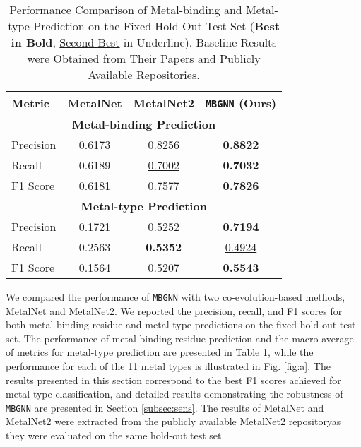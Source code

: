 \documentclass[letterpaper, 10 pt, conference]{ieeeconf}
\begin{document}
\begin{table}[t]
\centering
\caption{Performance Comparison of Metal-binding and Metal-type Prediction on the Fixed Hold-Out Test Set (\textbf{Best in Bold}, \underline{Second Best} in Underline). Baseline Results were Obtained from Their Papers and Publicly Available Repositories.}
\label{tab:performance_comparison}
\renewcommand{\arraystretch}{1.3} %
\begin{tabular}{lccc}
\hline
\textbf{Metric}        & \textbf{MetalNet\cite{cheng2023co}} & \textbf{MetalNet2\cite{10.1093/nsr/nwae391}} & \texttt{MBGNN} \textbf{(Ours)} \\ \hline
\multicolumn{4}{c}{\textbf{Metal-binding Prediction}} \\ \hline
Precision             & 0.6173          & \underline{0.8256}          & \textbf{0.8822} \\
Recall                & 0.6189          & \underline{0.7002}
& \textbf{0.7032} \\
F1 Score              & 0.6181          & \underline{0.7577}          & \textbf{0.7826} \\ \hline
\multicolumn{4}{c}{\textbf{Metal-type Prediction}} \\ \hline
Precision             & 0.1721          & \underline{0.5252}          & \textbf{0.7194} \\
Recall                & 0.2563          & \textbf{0.5352} & \underline{0.4924}\\
F1 Score              & 0.1564          & \underline{0.5207}          & \textbf{0.5543} \\ \hline

\end{tabular}

\vspace{-5pt}
\end{table}


We compared the performance of \texttt{MBGNN} with two co-evolution-based methods, MetalNet and MetalNet2. We reported the precision, recall, and F1 scores for both metal-binding residue and metal-type predictions on the fixed hold-out test set. The performance of metal-binding residue prediction and the macro average of metrics for metal-type prediction are presented in Table \ref{tab:performance_comparison}, while the performance for each of the 11 metal types is illustrated in Fig. \ref{fig:a}. The results presented in this section correspond to the best F1 scores achieved for metal-type classification, and detailed results demonstrating the robustness of \texttt{MBGNN} are presented in Section \ref{subsec:sens}. The results of MetalNet and MetalNet2 were extracted from the publicly available MetalNet2 repository\protect\footnotemark[1] as they were evaluated on the same hold-out test set.
\end{document}
